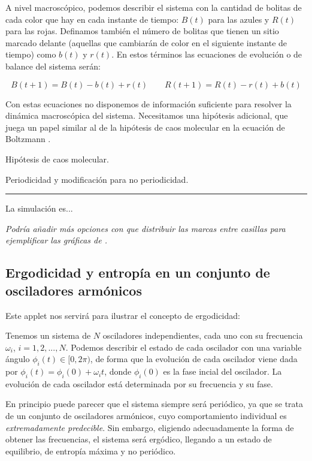 \documentclass[11pt, a4paper]{article} %
\theoremstyle{named}
\begin{document}
        A nivel macroscópico, podemos describir el sistema con la cantidad de bolitas de cada color que hay en cada instante de tiempo: $B(t)$ para las azules y $R(t)$ para las rojas. Definamos también el número de bolitas que tienen un sitio marcado delante (aquellas que cambiarán de color en el siguiente instante de tiempo) como $b(t)$ y $r(t)$. En estos términos las ecuaciones de evolución o de balance del sistema serán:

        \begin{equation}
            B(t+1) = B(t) - b(t) + r(t) \qquad
            R(t+1) = R(t) - r(t) + b(t)
        \end{equation}

        Con estas ecuaciones no disponemos de información suficiente para resolver la dinámica macroscópica del sistema. Necesitamos una hipótesis adicional, que juega un papel similar al de la hipótesis de caos molecular en la ecuación de Boltzmann \cite{haro}.

        Hipótesis de caos molecular. \cite{gottwald}

        Periodicidad y modificación para no periodicidad.

        \noindent\rule{\linewidth}{0.4pt}

        La simulación es...

        \textit{Podría añadir más opciones con que distribuir las marcas entre casillas para ejemplificar las gráficas de \cite{gottwald}.}

    \newpage
    \subsection{Ergodicidad y entropía en un conjunto de osciladores armónicos}\label{sec:osciladores}

        Este applet nos servirá para ilustrar el concepto de ergodicidad:

        Tenemos un sistema de $N$ osciladores independientes, cada uno con su frecuencia $\omega_i$, $i = 1,2,...,N$. Podemos describir el estado de cada oscilador con una variable ángulo $\phi_i (t) \in [0,2\pi)$, de forma que la evolución de cada oscilador viene dada por $\phi_i (t) = \phi_i (0) + \omega_i t$, donde $\phi_i(0)$ es la fase incial del oscilador. La evolución de cada oscilador está determinada por su frecuencia y su fase.

        En principio puede parecer que el sistema siempre será periódico, ya que se trata de un conjunto de osciladores armónicos, cuyo comportamiento individual es \textit{extremadamente predecible}. Sin embargo, eligiendo adecuadamente la forma de obtener las frecuencias, el sistema será ergódico, llegando a un estado de equilibrio, de entropía máxima y no periódico.
\end{document}
